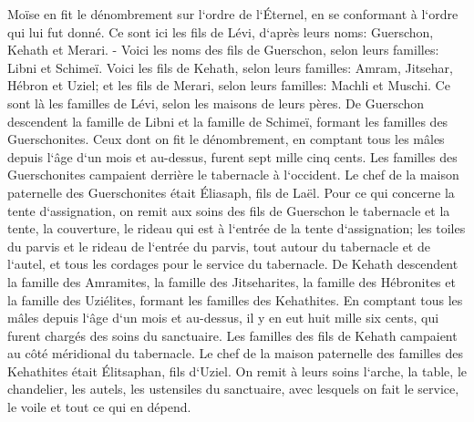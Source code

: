 \verse Moïse en fit le dénombrement sur l`ordre de l`Éternel, en se conformant à l`ordre qui lui fut donné. 
\verse Ce sont ici les fils de Lévi, d`après leurs noms: Guerschon, Kehath et Merari. - 
\verse Voici les noms des fils de Guerschon, selon leurs familles: Libni et Schimeï. 
\verse Voici les fils de Kehath, selon leurs familles: Amram, Jitsehar, Hébron et Uziel; 
\verse et les fils de Merari, selon leurs familles: Machli et Muschi. Ce sont là les familles de Lévi, selon les maisons de leurs pères. 
\verse De Guerschon descendent la famille de Libni et la famille de Schimeï, formant les familles des Guerschonites. 
\verse Ceux dont on fit le dénombrement, en comptant tous les mâles depuis l`âge d`un mois et au-dessus, furent sept mille cinq cents. 
\verse Les familles des Guerschonites campaient derrière le tabernacle à l`occident. 
\verse Le chef de la maison paternelle des Guerschonites était Éliasaph, fils de Laël. 
\verse Pour ce qui concerne la tente d`assignation, on remit aux soins des fils de Guerschon le tabernacle et la tente, la couverture, le rideau qui est à l`entrée de la tente d`assignation; 
\verse les toiles du parvis et le rideau de l`entrée du parvis, tout autour du tabernacle et de l`autel, et tous les cordages pour le service du tabernacle. 
\verse De Kehath descendent la famille des Amramites, la famille des Jitseharites, la famille des Hébronites et la famille des Uziélites, formant les familles des Kehathites. 
\verse En comptant tous les mâles depuis l`âge d`un mois et au-dessus, il y en eut huit mille six cents, qui furent chargés des soins du sanctuaire. 
\verse Les familles des fils de Kehath campaient au côté méridional du tabernacle. 
\verse Le chef de la maison paternelle des familles des Kehathites était Élitsaphan, fils d`Uziel. 
\verse On remit à leurs soins l`arche, la table, le chandelier, les autels, les ustensiles du sanctuaire, avec lesquels on fait le service, le voile et tout ce qui en dépend. 

